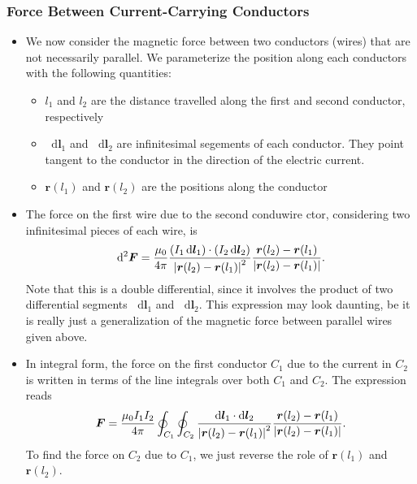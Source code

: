 \documentclass[11pt, a4paper]{article}
\newcommand{\diff}{\mathop{}\!\mathrm{d}} %
\renewcommand{\vec}[1]{\bm{#1}} %
\renewcommand{\r}{\vec{r}}
\newcommand{\mm}{\mu_{0}}  %
\begin{document}
\subsubsection{Force Between Current-Carrying Conductors}
\begin{itemize}
	\item We now consider the magnetic force between two conductors (wires) that are not necessarily parallel. We parameterize the position along each conductors with the following quantities:
    \begin{itemize}
        \item $ l_{1} $ and $ l_{2} $ are the distance travelled along the first and second conductor, respectively

        \item $ \diff \vec{l}_{1} $ and $ \diff \vec{l}_{2} $ are infinitesimal segements of each conductor. They point tangent to the conductor in the direction of the electric current.

        \item $ \r(l_{1})  $ and $ \r(l_{2})  $ are the positions along the conductor
    \end{itemize}
    
	\item The force on the first wire due to the second conduwire ctor, considering two infinitesimal pieces of each wire, is
	\begin{equation*}
		\diff^{2}\vec{F} = \frac{\mm}{4\pi}\frac{(I_{1}\diff \vec{l}_{1}) \cdot (I_{2}\diff \vec{l}_{2})}{\abs{\r(l_{2}) - \r(l_{1})}^{2}}\frac{\r(l_{2}) - \r(l_{1})}{\abs{\r(l_{2}) - \r(l_{1})}}.
	\end{equation*}
    Note that this is a double differential, since it involves the product of two differential segments $ \diff \vec{l}_{1} $ and $ \diff \vec{l}_{2} $. This expression may look daunting, be it is really just a generalization of the magnetic force between parallel wires given above.
	
	\item In integral form, the force on the first conductor $ C_{1} $ due to the current in $ C_{2} $ is written in terms of the line integrals over both $ C_{1} $ and $ C_{2} $. The expression reads
	\begin{equation*}
		\vec{F} = \frac{\mm I_{1}I_{2}}{4\pi}\oint_{C_{1}}\oint_{C_{2}}\frac{\diff \vec{l}_{1} \cdot \diff \vec{l}_{2}}{\abs{\r(l_{2}) - \r(l_{1})}^{2}} \frac{\r(l_{2}) - \r(l_{1})}{\abs{\r(l_{2}) - \r(l_{1})}}.
	\end{equation*}
	To find the force on $ C_{2} $ due to $ C_{1} $, we just reverse the role of $ \r(l_{1}) $ and $ \r(l_{2}) $.
	

\end{itemize}
\end{document}
